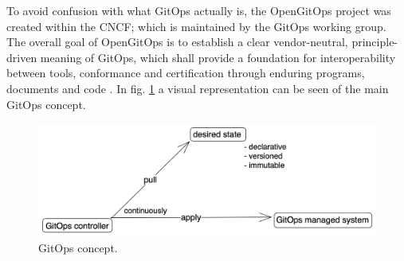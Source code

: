 

To avoid confusion with what GitOps actually is, 
the OpenGitOps project
\autocite{openGitOpsProject}
was created within the CNCF;
which is maintained by the GitOps working group.
The overall goal of OpenGitOps is to establish a clear vendor-neutral,
principle-driven meaning of GitOps,
which shall provide a foundation for interoperability between tools, conformance and certification through enduring programs, documents and code
\autocite{opengitopsDocuments}.
In fig. \ref{fig:gitOpsConcept} a visual representation can be seen of the main GitOps concept.

\begin{figure}[h]
	\centering
	\includegraphics[width=1.00\linewidth]{assets/gitops-concept.png}
	\caption{GitOps concept.
	}
	\label{fig:gitOpsConcept}	
\end{figure}


